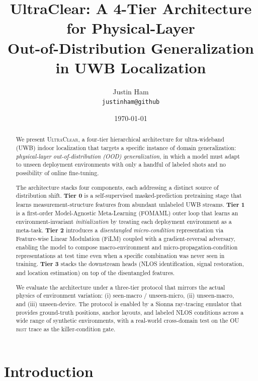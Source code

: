 \documentclass[11pt,letterpaper]{article}
\title{\textbf{UltraClear}: A 4-Tier Architecture for Physical-Layer\\
  Out-of-Distribution Generalization in UWB Localization}
\author{Justin Ham \\ \small \texttt{justinham@github}}
\date{\today}
\begin{document}
\maketitle

\begin{abstract}
We present \textsc{UltraClear}, a four-tier hierarchical architecture for
ultra-wideband (UWB) indoor localization that targets a specific
instance of domain generalization: \emph{physical-layer
out-of-distribution (OOD) generalization}, in which a model must
adapt to unseen deployment environments with only a handful of
labeled shots and no possibility of online fine-tuning.

The architecture stacks four components, each addressing a distinct
source of distribution shift.
\textbf{Tier 0} is a self-supervised masked-prediction pretraining
stage that learns measurement-structure features from abundant
unlabeled UWB streams.
\textbf{Tier 1} is a first-order Model-Agnostic Meta-Learning
(FOMAML) outer loop that learns an environment-invariant
\emph{initialization} by treating each deployment environment as a
meta-task.
\textbf{Tier 2} introduces a \emph{disentangled micro-condition}
representation via Feature-wise Linear Modulation (FiLM) coupled with
a gradient-reversal adversary, enabling the model to compose
macro-environment and micro-propagation-condition representations
at test time even when a specific combination was never seen in
training.
\textbf{Tier 3} stacks the downstream heads (NLOS identification,
signal restoration, and location estimation) on top of the
disentangled features.

We evaluate the architecture under a three-tier protocol that
mirrors the actual physics of environment variation: (i)
seen-macro / unseen-micro, (ii) unseen-macro, and (iii)
unseen-device. The protocol is enabled by a Sionna ray-tracing
emulator that provides ground-truth positions, anchor layouts, and
labeled NLOS conditions across a wide range of synthetic
environments, with a real-world cross-domain test on the
\textsc{OU best} trace as the killer-condition gate.
\end{abstract}

\section{Introduction}
\label{sec:intro}
\end{document}
